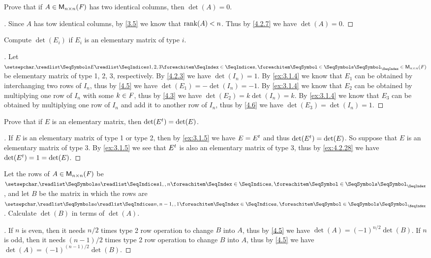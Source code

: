 \begin{ex}\label{ex:4.2.27}
	Prove that if \(A \in \mathsf{M}_{{n} \times n}({\mathit{F}})\) has two identical columns, then \(\det(A) = 0\).
\end{ex}

\begin{proof}[]
	Since \(A\) has tow identical columns, by \cref{3.5} we know that \(\rk{A} < n\).
	Thus by \cref{4.2.7} we have \(\det(A) = 0\).
\end{proof}

\begin{ex}\label{ex:4.2.28}
	Compute \(\det(E_i)\) if \(E_i\) is an elementary matrix of type \(i\).
\end{ex}

\begin{proof}[]
	Let \(\seq{E}{1,2,3} \in \ms{n}{n}{\F}\) be elementary matrix of type 1, 2, 3, respectively.
	By \cref{4.2.3} we have \(\det(I_n) = 1\).
	By \cref{ex:3.1.4} we know that \(E_1\) can be obtained by interchanging two rows of \(I_n\), thus by \cref{4.5} we have \(\det(E_1) = -\det(I_n) = -1\).
	By \cref{ex:3.1.4} we know that \(E_2\) can be obtained by multiplying one row of \(I_n\) with some \(k \in \mathit{F}\), thus by \cref{4.3} we have \(\det(E_2) = k \det(I_n) = k\).
	By \cref{ex:3.1.4} we know that \(E_3\) can be obtained by multiplying one row of \(I_n\) and add it to another row of \(I_n\), thus by \cref{4.6} we have \(\det(E_3) = \det(I_n) = 1\).
\end{proof}

\begin{ex}\label{ex:4.2.29}
	Prove that if \(E\) is an elementary matrix, then \(\det({E}^{t}) = \det(E)\).
\end{ex}

\begin{proof}[]
	If \(E\) is an elementary matrix of type 1 or type 2, then by \cref{ex:3.1.5} we have \(E = {E}^{t}\) and thus \(\det({E}^{t}) = \det(E)\).
	So suppose that \(E\) is an elementary matrix of type 3.
	By \cref{ex:3.1.5} we see that \({E}^{t}\) is also an elementary matrix of type 3, thus by \cref{ex:4.2.28} we have \(\det({E}^{t}) = 1 = \det(E)\).
\end{proof}

\begin{ex}\label{ex:4.2.30}
	Let the rows of \(A \in \mathsf{M}_{{n} \times n}({\mathit{F}})\) be \(\seq{a}{1,,n}\), and let \(B\) be the matrix in which the rows are \(\seq{a}{n,n-1,,1}\).
	Calculate \(\det(B)\) in terms of \(\det(A)\).
\end{ex}

\begin{proof}[]
	If \(n\) is even, then it needs \(n / 2\) times type 2 row operation to change \(B\) into \(A\), thus by \cref{4.5} we have \(\det(A) = (-1)^{n / 2} \det(B)\).
	If \(n\) is odd, then it needs \((n - 1) / 2\) times type 2 row operation to change \(B\) into \(A\), thus by \cref{4.5} we have \(\det(A) = (-1)^{(n - 1) / 2} \det(B)\).
\end{proof}
